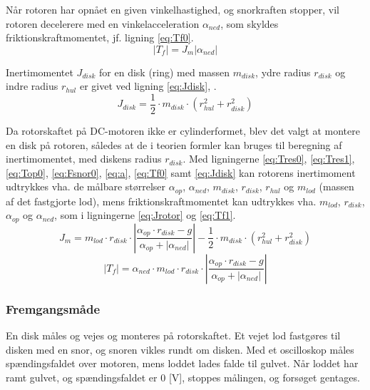 Når rotoren har opnået en given vinkelhastighed, og snorkraften stopper,
vil rotoren decelerere med en vinkelacceleration \(\alpha_{ned}\), som skyldes friktionskraftmomentet,
jf. ligning \ref{eq:Tf0}.
\begin{equation}
	\left|T_f\right|=J_m\left|\alpha_{ned}\right|
	\label{eq:Tf0}
 \end{equation}

Inertimomentet \(J_{disk}\) for en disk (ring) med massen \(m_{disk}\), ydre radius \(r_{disk}\) og
indre radius \(r_{hul}\) er givet ved ligning \ref{eq:Jdisk}, \citep[Side. 255, tabel 10-2b]{fund_of_physics}.
\begin{equation}
	J_{disk}=\frac{1}{2}\cdot{m_{disk}}\cdot\left(r_{hul}^2+r_{disk}^2\right)
	\label{eq:Jdisk}
 \end{equation}

Da rotorskaftet på DC-motoren ikke er cylinderformet, blev det valgt at montere en disk
på rotoren, således at de i teorien formler kan bruges til beregning af inertimomentet,
med diskens radius \(r_{disk}\).
Med ligningerne \ref{eq:Tres0}, \ref{eq:Tres1}, \ref{eq:Top0}, \ref{eq:Fsnor0}, \ref{eq:a}, \ref{eq:Tf0} samt \ref{eq:Jdisk}
kan rotorens inertimoment udtrykkes vha. de målbare størrelser
\(\alpha_{op}\), \(\alpha_{ned}\), \(m_{disk}\), \(r_{disk}\), \(r_{hul}\) og \(m_{lod}\) (massen af det fastgjorte lod),
mens friktionskraftmomentet kan udtrykkes vha. \(m_{lod}\), \(r_{disk}\), \(\alpha_{op}\) og \(\alpha_{ned}\),
som i ligningerne \ref{eq:Jrotor} og \ref{eq:Tf1}.
\begin{equation}
J_{ m }=m_{ lod }\cdot { r_{ disk } }\cdot \left| \frac { \alpha _{ op }\cdot { r_{ disk } }-g }{ \alpha _{ op }+\left| \alpha _{ ned } \right|  }  \right| -\frac { 1 }{ 2 } \cdot { m_{ disk } }\cdot \left( r_{ hul }^{ 2 }+r_{ disk }^{ 2 } \right) 
	\label{eq:Jrotor}
\end{equation}
\begin{equation}
\left| T_{ f } \right| =\alpha _{ ned }\cdot { m_{ lod } }\cdot { r_{ disk } }\cdot \left| \frac { \alpha _{ op }\cdot { r_{ disk } }-g }{ \alpha _{ op }+\left| \alpha _{ ned } \right|  }  \right| 
	\label{eq:Tf1}
 \end{equation}
\subsubsection{Fremgangsmåde}
En disk måles og vejes og monteres på rotorskaftet.
Et vejet lod fastgøres til disken med en snor, og snoren vikles rundt om disken.
Med et oscilloskop måles spændingsfaldet over motoren, mens loddet lades falde til gulvet.
Når loddet har ramt gulvet, og spændingsfaldet er 0 [V], stoppes målingen, og forsøget gentages.
